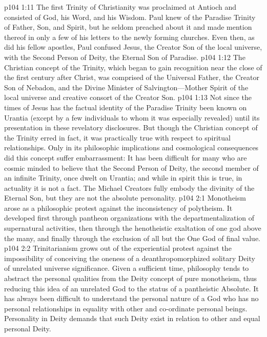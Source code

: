 \vs p104 1:11 The first Trinity of Christianity was proclaimed at Antioch and consisted of God, his Word, and his Wisdom. Paul knew of the Paradise Trinity of Father, Son, and Spirit, but he seldom preached about it and made mention thereof in only a few of his letters to the newly forming churches. Even then, as did his fellow apostles, Paul confused Jesus, the Creator Son of the local universe, with the Second Person of Deity, the Eternal Son of Paradise.
\vs p104 1:12 The Christian concept of the Trinity, which began to gain recognition near the close of the first century after Christ, was comprised of the Universal Father, the Creator Son of Nebadon, and the Divine Minister of Salvington---Mother Spirit of the local universe and creative consort of the Creator Son.
\vs p104 1:13 Not since the times of Jesus has the factual identity of the Paradise Trinity been known on Urantia (except by a few individuals to whom it was especially revealed) until its presentation in these revelatory disclosures. But though the Christian concept of the Trinity erred in fact, it was practically true with respect to spiritual relationships. Only in its philosophic implications and cosmological consequences did this concept suffer embarrassment: It has been difficult for many who are cosmic minded to believe that the Second Person of Deity, the second member of an infinite Trinity, once dwelt on Urantia; and while in spirit this is true, in actuality it is not a fact. The Michael Creators fully embody the divinity of the Eternal Son, but they are not the absolute personality.
\vs p104 2:1 Monotheism arose as a philosophic protest against the inconsistency of polytheism. It developed first through pantheon organizations with the departmentalization of supernatural activities, then through the henotheistic exaltation of one god above the many, and finally through the exclusion of all but the One God of final value.
\vs p104 2:2 Trinitarianism grows out of the experiential protest against the impossibility of conceiving the oneness of a deanthropomorphized solitary Deity of unrelated universe significance. Given a sufficient time, philosophy tends to abstract the personal qualities from the Deity concept of pure monotheism, thus reducing this idea of an unrelated God to the status of a pantheistic Absolute. It has always been difficult to understand the personal nature of a God who has no personal relationships in equality with other and co\hyp{}ordinate personal beings. Personality in Deity demands that such Deity exist in relation to other and equal personal Deity.

